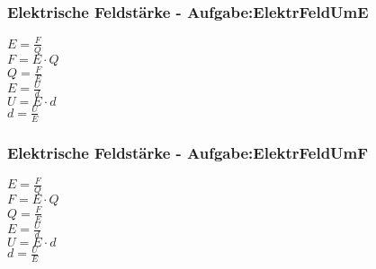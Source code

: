 \subsubsection{Elektrische Feldstärke - Aufgabe:ElektrFeldUmE} 
\begin{minipage}{0.45\textwidth} 
$ E = \frac{F}{Q} $\\ 
$ F = E\cdot Q $\\ 
$ Q = \frac{F}{E} $\\ 
$ E = \frac{U}{d} $\\ 
$ U = E\cdot d $\\ 
$ d = \frac{U}{E} $\\ 
\end{minipage} 
\begin{minipage}{0.45\textwidth} 
 
\end{minipage} 
\subsubsection{Elektrische Feldstärke - Aufgabe:ElektrFeldUmF} 
\begin{minipage}{0.45\textwidth} 
$ E = \frac{F}{Q} $\\ 
$ F = E\cdot Q $\\ 
$ Q = \frac{F}{E} $\\ 
$ E = \frac{U}{d} $\\ 
$ U = E\cdot d $\\ 
$ d = \frac{U}{E} $\\ 
\end{minipage} 
\begin{minipage}{0.45\textwidth} 
 
\end{minipage} 
